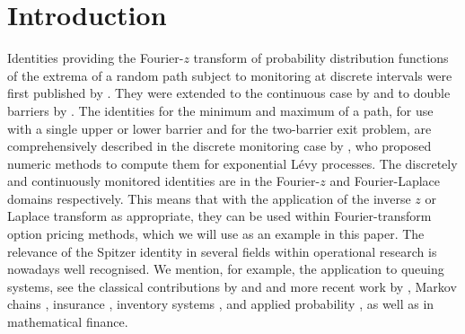 \documentclass[11pt,a4paper]{article}
\begin{document}
\section{Introduction}

Identities providing the Fourier-$z$ transform of probability distribution functions of the extrema of a random path subject to monitoring at discrete intervals were first published by \cite{spitzer1956combinatorial}. They were extended to the continuous case by \cite{baxter1957distribution} and to double barriers by \cite{Kemperman1963}. The identities for the minimum and maximum of a path, for use with a single upper or lower barrier and for the two-barrier exit problem, are comprehensively described in the discrete monitoring case by \cite{Fusai2016}, who proposed numeric methods to compute them for exponential L\'evy processes. The discretely and continuously monitored identities are in the Fourier-$z$ and Fourier-Laplace domains respectively. This means that with the application of the inverse $z$ or Laplace transform as appropriate, they can be used within Fourier-transform option pricing methods, which we will use as an example in this paper. The relevance of the Spitzer identity in several fields within operational research is nowadays well recognised. We mention, for example, the application to queuing systems, see the classical contributions by \cite{cohen1975,cohen1982} and \cite{prabhu1974} and more recent work by \cite{bayer1996}, Markov chains \citep{rogers1994}, insurance \citep{chi2011}, inventory systems \citep{cohen1978,grassman1989}, and applied probability \citep{grassman1990}, as well as in mathematical finance.
\end{document}
